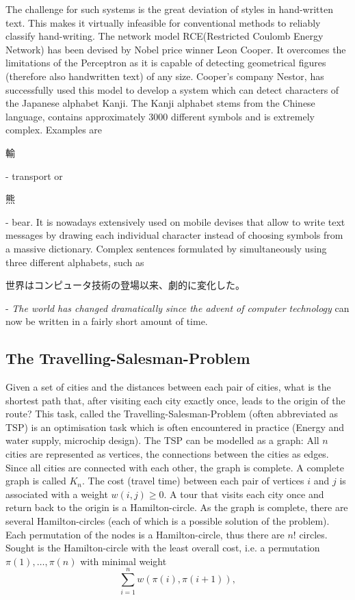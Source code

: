 \documentclass[10pt,a4paper,DIV=11]{scrreprt}
\begin{document}
The challenge for such systems is the great deviation of styles in hand-written text. This makes it virtually infeasible for conventional methods to reliably classify hand-writing. 
The network model RCE(Restricted Coulomb Energy Network) has been devised by Nobel price winner Leon Cooper. It overcomes the limitations of the Perceptron as it is capable of detecting geometrical figures (therefore also handwritten text) of any size. 
Cooper's company Nestor, has successfully used this model to develop a system which can detect characters of the Japanese alphabet Kanji. The Kanji alphabet stems from the Chinese language, contains approximately 3000 different symbols and is extremely complex. 
Examples are \begin{CJK}{UTF8}{min}輸\end{CJK} - transport or \begin{CJK}{UTF8}{min}熊\end{CJK} - bear. It is nowadays extensively used on mobile devises that allow to write text messages by drawing each individual character instead of choosing symbols from a massive dictionary. 
Complex sentences formulated by simultaneously using three different alphabets, such as \begin{CJK}{UTF8}{min}世界はコンピュータ技術の登場以来、劇的に変化した。\end{CJK} - \textit{The world has changed dramatically since the advent of computer technology} can now be written in a fairly short amount of time.

\subsection{The Travelling-Salesman-Problem}
Given a set of cities and the distances between each pair of cities, what is the shortest path that, after visiting each city exactly once, leads to the origin of the route? This task, called the Travelling-Salesman-Problem (often abbreviated as TSP) is an optimisation task which is often encountered in practice (Energy and water supply, microchip design). The TSP can be modelled as a graph: All $n$ cities are represented as vertices, the connections between the cities as edges. Since all cities are connected with each other, the graph is complete. A complete graph is called $K_n$. The cost (travel time) between each pair of vertices $i$ and $j$ is associated with a weight $w(i,j) \geq 0$. A tour that visits each city once and return back to the origin is a Hamilton-circle. As the graph is complete, there are several Hamilton-circles (each of which is a possible solution of the problem). Each permutation of the nodes is a Hamilton-circle, thus there are $n!$ circles. Sought is the Hamilton-circle with the least overall cost, i.e. a permutation $\pi(1),\dots,\pi(n)$ with minimal weight
\begin{equation}
    \sum\limits_{i=1}^n w(\pi(i),\pi(i+1)), 
\end{equation}
\end{document}
